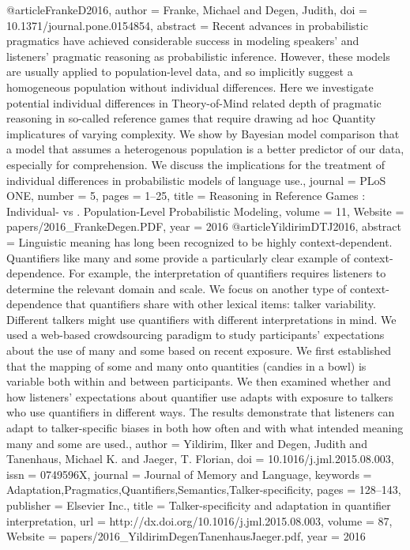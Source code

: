 @article{FrankeD2016,
author = {Franke, Michael and Degen, Judith},
doi = {10.1371/journal.pone.0154854},
abstract = {Recent advances in probabilistic pragmatics have achieved considerable success in modeling speakers’ and listeners’ pragmatic reasoning as probabilistic inference. However, these models are usually applied to population-level data, and so implicitly suggest a homogeneous population without individual differences. Here we investigate potential individual differences in Theory-of-Mind related depth of pragmatic reasoning in so-called reference games that require drawing ad hoc Quantity implicatures of varying complexity. We show by Bayesian model comparison that a model that assumes a heterogenous population is a better predictor of our data, especially for comprehension. We discuss the implications for the treatment of individual differences in probabilistic models of language use.},
journal = {PLoS ONE},
number = {5},
pages = {1--25},
title = {{Reasoning in Reference Games : Individual- vs . Population-Level Probabilistic Modeling}},
volume = {11},
Website = {papers/2016_FrankeDegen.PDF},
year = {2016}
}
@article{YildirimDTJ2016,
abstract = {Linguistic meaning has long been recognized to be highly context-dependent. Quantifiers like many and some provide a particularly clear example of context-dependence. For example, the interpretation of quantifiers requires listeners to determine the relevant domain and scale. We focus on another type of context-dependence that quantifiers share with other lexical items: talker variability. Different talkers might use quantifiers with different interpretations in mind. We used a web-based crowdsourcing paradigm to study participants' expectations about the use of many and some based on recent exposure. We first established that the mapping of some and many onto quantities (candies in a bowl) is variable both within and between participants. We then examined whether and how listeners' expectations about quantifier use adapts with exposure to talkers who use quantifiers in different ways. The results demonstrate that listeners can adapt to talker-specific biases in both how often and with what intended meaning many and some are used.},
author = {Yildirim, Ilker and Degen, Judith and Tanenhaus, Michael K. and Jaeger, T. Florian},
doi = {10.1016/j.jml.2015.08.003},
issn = {0749596X},
journal = {Journal of Memory and Language},
keywords = {Adaptation,Pragmatics,Quantifiers,Semantics,Talker-specificity},
pages = {128--143},
publisher = {Elsevier Inc.},
title = {{Talker-specificity and adaptation in quantifier interpretation}},
url = {http://dx.doi.org/10.1016/j.jml.2015.08.003},
volume = {87},
Website = {papers/2016_YildirimDegenTanenhausJaeger.pdf},
year = {2016}
}
